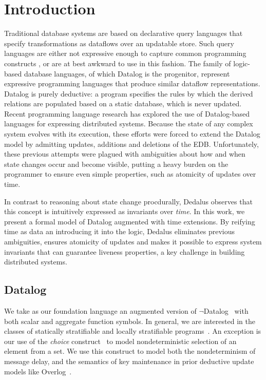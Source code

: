 \section{Introduction}

Traditional database systems are based on declarative query languages that
specify transformations as dataflows over an updatable store.  Such query
languages are either not expressive enough to capture common programming
constructs , or are at best awkward to use in this fashion.
 The family of logic-based database languages, of
which Datalog is the progenitor, represent expressive programming languages
that produce similar dataflow representations.  Datalog is purely deductive: a
program specifies the rules by which the derived relations are populated based
on a static database, which is never updated.  Recent programming language
research has explored the use of Datalog-based languages for expressing
distributed systems.  Because the state of any complex system evolves with its
execution, these efforts were forced to extend the Datalog model by admitting
updates, additions and deletions of the EDB.  Unfortunately, these previous
attempts were plagued with ambiguities about how and when state changes occur
and become visible, putting a heavy burden on the programmer to ensure even
simple properties, such as atomicity of updates over time.

In contrast to reasoning about state change procdurally, Dedalus observes
that this concept is intuitively expressed as invariants over {\em time}.  In
this work, we present a formal model of Datalog augmented with time extensions.
By reifying time as data an introducing it into the logic, Dedalus eliminates
previous ambiguities, ensures atomicity of updates and makes it possible to
express system invariants that can guarantee liveness properties, a key
challenge in building distributed systems.

\subsection{Datalog}

We take as our foundation language an augmented version of \linebreak
$\lnot$Datalog~\cite{ullmanbook} with both scalar and aggregate function
symbols.  In general, we are interested in the classes of statically
stratifiable and locally stratifiable programs~\cite{prz}.  An exception is our
use of the \emph{choice} construct~\cite{greedychoice, eventchoice} to model
nondeterministic selection of an element from a set.  We use this construct to
model both the nondeterminism of message delay, and the semantics of key
maintenance in prior deductive update models like Overlog~\cite{boon}.
